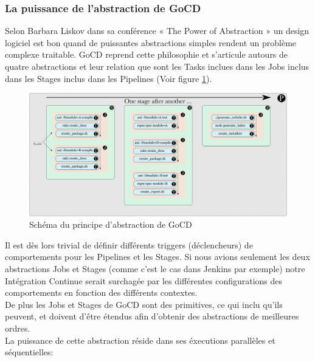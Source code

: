     \subsubsection{La puissance de l'abstraction de GoCD}
    Selon Barbara Liskov dans sa conférence « The Power of Abstraction » \cite{Lis09} un design logiciel est bon quand de puissantes abstractions simples rendent un problème complexe traitable. GoCD reprend cette philosophie et s'articule autours de quatre abstractions et leur relation que sont les Tasks inclues dans les Jobs inclus dans les Stages inclus dans les Pipelines (Voir figure \ref{Pipeline}).\\

    \begin{figure}
      \begin{center}
        \includegraphics[scale=0.7]{images/pipeline.png}
      \end{center}
      \caption{Schéma du principe d'abstraction de GoCD}
      \label{Pipeline}
    \end{figure}

    Il est dès lors trivial de définir différents triggers (déclencheurs) de comportements pour les Pipelines et les Stages. Si nous avions seulement les deux abstractions Jobs et Stages (comme c'est le cas dans Jenkins par exemple) notre Intégration Continue serait surchagée par les différentes configurations des comportements en fonction des différents contextes.\\

    De plus les Jobs et Stages de GoCD sont des primitives, ce qui inclu qu'ils peuvent, et doivent d'être étendus afin d'obtenir des abstractions de meilleures ordres.\\

    La puissance de cette abstraction réside dans ses éxecutions parallèles et séquentielles:\\

